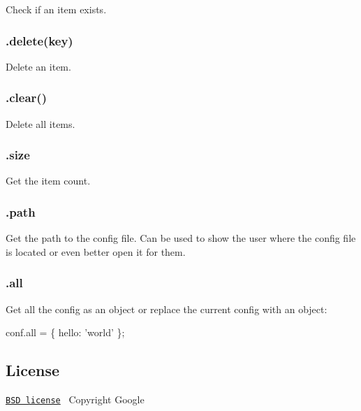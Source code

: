 Check if an item exists.

\subsubsection*{.delete(key)}

Delete an item.

\subsubsection*{.clear()}

Delete all items.

\subsubsection*{.size}

Get the item count.

\subsubsection*{.path}

Get the path to the config file. Can be used to show the user where the config file is located or even better open it for them.

\subsubsection*{.all}

Get all the config as an object or replace the current config with an object\+:


\begin{DoxyCode}
conf.all = \{
    hello: 'world'
\};
\end{DoxyCode}


\subsection*{License}

\href{http://opensource.org/licenses/bsd-license.php}{\tt B\+SD license}~\newline
 Copyright Google 